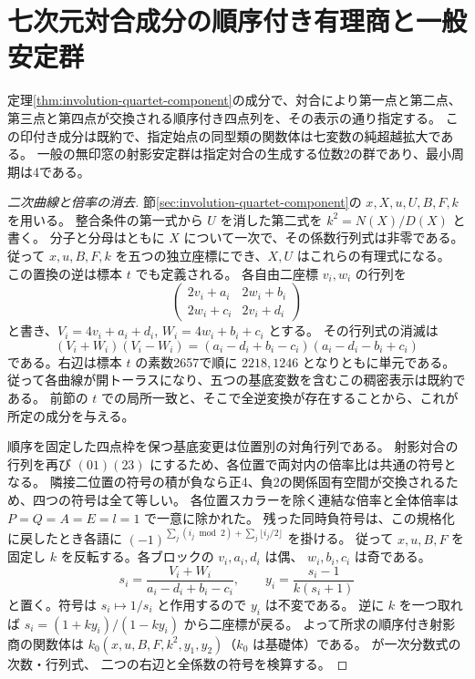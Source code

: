 \section{七次元対合成分の順序付き有理商と一般安定群}
\label{sec:rational-ordered-quartet}
\begin{theorem}\label{thm:rational-ordered-quartet}
定理\ref{thm:involution-quartet-component}の成分で、対合により第一点と第二点、
第三点と第四点が交換される順序付き四点列を、その表示の通り指定する。
この印付き成分は既約で、指定始点の同型類の関数体は七変数の純超越拡大である。
一般の無印窓の射影安定群は指定対合の生成する位数2の群であり、最小周期は4である。
\end{theorem}

\begin{proof}[二次曲線と倍率の消去]
節\ref{sec:involution-quartet-component}の $x,X,u,U,B,F,k$ を用いる。
整合条件の第一式から $U$ を消した第二式を $k^2=N(X)/D(X)$ と書く。
分子と分母はともに $X$ について一次で、その係数行列式は非零である。
従って $x,u,B,F,k$ を五つの独立座標にでき、$X,U$ はこれらの有理式になる。
この置換の逆は標本 $t$ でも定義される。
各自由二座標 $v_i,w_i$ の行列を
\[
 \begin{pmatrix}2v_i+a_i&2w_i+b_i\\2w_i+c_i&2v_i+d_i\end{pmatrix}
\]
と書き、$V_i=4v_i+a_i+d_i$, $W_i=4w_i+b_i+c_i$ とする。
その行列式の消滅は
\[
 (V_i+W_i)(V_i-W_i)=(a_i-d_i+b_i-c_i)(a_i-d_i-b_i+c_i)
\]
である。右辺は標本 $t$ の素数2657で順に $2218,1246$ となりともに単元である。
従って各曲線が開トーラスになり、五つの基底変数を含むこの稠密表示は既約である。
前節の $t$ での局所一致と、そこで全逆変換が存在することから、これが所定の成分を与える。

順序を固定した四点枠を保つ基底変更は位置別の対角行列である。
射影対合の行列を再び $(01)(23)$ にするため、各位置で両対内の倍率比は共通の符号となる。
隣接二位置の符号の積が負なら正4、負2の関係固有空間が交換されるため、四つの符号は全て等しい。
各位置スカラーを除く連結な倍率と全体倍率は $P=Q=A=E=l=1$ で一意に除かれた。
残った同時負符号は、この規格化に戻したとき各語に
$(-1)^{\sum_j (i_j\bmod 2)+\sum_j\lfloor i_j/2\rfloor}$ を掛ける。
従って $x,u,B,F$ を固定し $k$ を反転する。各ブロックの $v_i,a_i,d_i$ は偶、
$w_i,b_i,c_i$ は奇である。
\[
 s_i=\frac{V_i+W_i}{a_i-d_i+b_i-c_i},\qquad
 y_i=\frac{s_i-1}{k(s_i+1)}
\]
と置く。符号は $s_i\mapsto 1/s_i$ と作用するので $y_i$ は不変である。
逆に $k$ を一つ取れば $s_i=(1+ky_i)/(1-ky_i)$ から二座標が戻る。
よって所求の順序付き射影商の関数体は
$k_0(x,u,B,F,k^2,y_1,y_2)$（$k_0$ は基礎体）である。
 が一次分数式の次数・行列式、
二つの右辺と全係数の符号を検算する。
\end{proof}

